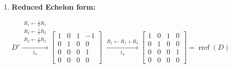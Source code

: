\begin{enumerate}
    \item
    \textbf{Reduced Echelon form:} \\[1.0em]
    \begin{answer}
        $D' \xrightarrow[t_3]{
            \substack{
                R_1 \leftarrow \frac{1}{2}R_1 \\
                R_2 \leftarrow \frac{1}{2}R_2 \\
                R_3 \leftarrow \frac{1}{8}R_3
            }
        }
        \begin{bmatrix}
            1 & 0 & 1 & -1 \\
            0 & 1 & 0 & 0 \\
            0 & 0 & 0 & 1 \\
            0 & 0 & 0 & 0
        \end{bmatrix}
        $
        $\xrightarrow[t_4]{R_1 \leftarrow R_1+R_3}
        \begin{bmatrix}
            1 & 0 & 1 & 0 \\
            0 & 1 & 0 & 0 \\
            0 & 0 & 0 & 1 \\
            0 & 0 & 0 & 0
        \end{bmatrix}
        = \operatorname{rref}(D)$
    \end{answer}
\end{enumerate}
